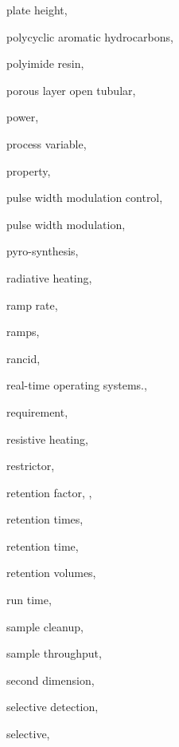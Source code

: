 \begin{theindex}
  \item \lowercase {plate height}, 
  \item \lowercase {polycyclic aromatic hydrocarbons}, 
  \item \lowercase {polyimide resin}, 
  \item \lowercase {porous layer open tubular}, 
  \item \lowercase {power}, 
  \item \lowercase {process variable}, 
  \item \lowercase {property}, 
  \item \lowercase {pulse width modulation control}, 
  \item \lowercase {pulse width modulation}, 
  \item \lowercase {pyro-synthesis}, 
  \item \lowercase {radiative heating}, 
  \item \lowercase {ramp rate}, 
  \item \lowercase {ramps}, 
  \item \lowercase {rancid}, 
  \item \lowercase {real-time operating systems.}, 
  \item \lowercase {requirement}, 
  \item \lowercase {resistive heating}, 
  \item \lowercase {restrictor}, 
  \item \lowercase {retention factor}, , 
  \item \lowercase {retention times}, 
  \item \lowercase {retention time}, 
  \item \lowercase {retention volumes}, 
  \item \lowercase {run time}, 
  \item \lowercase {sample cleanup}, 
  \item \lowercase {sample throughput}, 
  \item \lowercase {second dimension}, 
  \item \lowercase {selective detection}, 
  \item \lowercase {selective}, 

\end{theindex}
